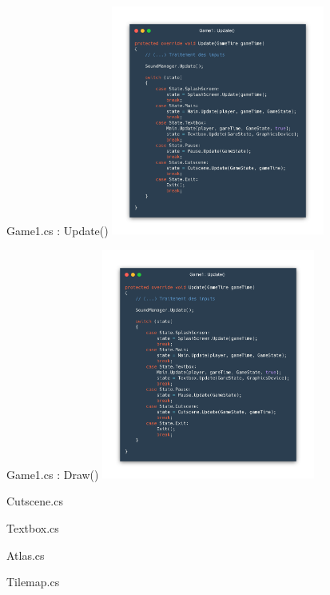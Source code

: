 \documentclass{beamer}
\begin{document}
\begin{frame}{Game1.cs : Update()}
    \centering
    \includegraphics[width=7cm]{assets/game1update}
\end{frame}

\begin{frame}{Game1.cs : Draw()}
    \centering
    \includegraphics[width=7cm]{assets/game1update}
\end{frame}

\begin{frame}{Cutscene.cs}
  
\end{frame}

\begin{frame}{Textbox.cs}
  
\end{frame}

\begin{frame}{Atlas.cs}
  
\end{frame}

\begin{frame}{Tilemap.cs}
  
\end{frame}
\end{document}

